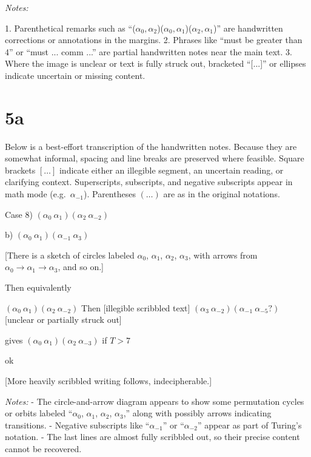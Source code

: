 \documentclass[12pt]{article}
\begin{document}
\bigskip

\textit{Notes:}

1. Parenthetical remarks such as ``(\(\alpha_0, \alpha_2\))(\(\alpha_0, \alpha_1\))(\(\alpha_2, \alpha_1\))'' are handwritten corrections or annotations in the margins.  
2. Phrases like ``must be greater than 4'' or ``must ... comm ...'' are partial handwritten notes near the main text.  
3. Where the image is unclear or text is fully struck out, bracketed ``[...]'' or ellipses indicate uncertain or missing content.

\section{5a}

Below is a best-effort transcription of the handwritten notes. Because they are somewhat informal, spacing and line breaks are preserved where feasible. 
Square brackets \([ \ldots ]\) indicate either an illegible segment, an uncertain reading, or clarifying context. 
Superscripts, subscripts, and negative subscripts appear in math mode (e.g.\ \(\alpha_{-1}\)). 
Parentheses \((\ldots)\) are as in the original notations.

\bigskip

Case 8) \((\alpha_0 \ \alpha_1)(\alpha_2 \ \alpha_{-2})\)

b) \((\alpha_0 \ \alpha_1)(\alpha_{-1} \ \alpha_3)\)

[There is a sketch of circles labeled \(\alpha_0\), \(\alpha_1\), \(\alpha_2\), \(\alpha_3\),
 with arrows from \(\alpha_0 \to \alpha_1 \to \alpha_3\), and so on.]

Then equivalently

\((\alpha_0 \ \alpha_1)(\alpha_2 \ \alpha_{-2})\)  Then [illegible scribbled text]
\((\alpha_3 \ \alpha_{-2})(\alpha_{-1} \ \alpha_{-5}?)\)  [unclear or partially struck out]

gives  \((\alpha_0 \ \alpha_1)(\alpha_2 \ \alpha_{-3})\) if \(T > 7\)

ok

[More heavily scribbled writing follows, indecipherable.]

\bigskip

\textit{Notes:}
- The circle-and-arrow diagram appears to show some permutation cycles or orbits labeled ``\(\alpha_0\), \(\alpha_1\), \(\alpha_2\), \(\alpha_3\),'' along with possibly arrows indicating transitions.  
- Negative subscripts like ``\(\alpha_{-1}\)'' or ``\(\alpha_{-2}\)'' appear as part of Turing's notation.  
- The last lines are almost fully scribbled out, so their precise content cannot be recovered.
\end{document}
